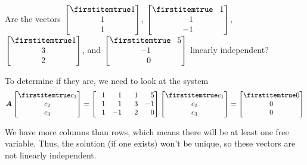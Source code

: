 \documentclass{beamer}
\begin{document}
\begin{frame}
\begin{example}
Are the vectors $\bvector{1,1,1}$, $\bvector{\+1,\+1, -1}$, $\bvector{1,3,2}$, and $\bvector{\+5,-1,\+0}$ linearly independent?\pause

To determine if they are, we need to look at the system
\begin{equation*}
\mat{A}\bvector{c_1,c_2,c_3}=
\begin{bmatrix}
\+1 & \+1 & \+1 & \+5 \\
\+1 & \+1 & \+3 &  -1 \\
\+1 &  -1 & \+2 & \+0 \\
\end{bmatrix}
\bvector{c_1,c_2,c_3}=\bvector{0,0,0}
\end{equation*}\pause

We have more columns than rows, which means there will be at least one free variable. Thus, the solution (if one exists) won't be unique, so these vectors are not linearly independent.
\end{example}
\end{frame}
\end{document}
